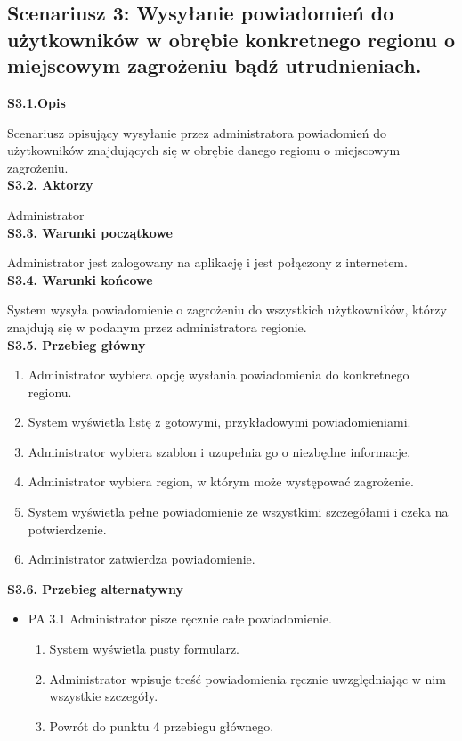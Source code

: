     \subsection*{Scenariusz 3: Wysyłanie powiadomień do użytkowników w obrębie konkretnego regionu o miejscowym zagrożeniu bądź utrudnieniach.} 
    \textbf{S3.1.Opis} \par
    Scenariusz opisujący wysyłanie przez administratora powiadomień do użytkowników znajdujących się w obrębie danego regionu o miejscowym zagrożeniu. \\
    \textbf{S3.2. Aktorzy} \par
    Administrator \\
    \textbf{S3.3. Warunki początkowe} \par
    Administrator jest zalogowany na aplikację i jest połączony z internetem. \\
    \textbf{S3.4. Warunki końcowe} \par
    System wysyła powiadomienie o zagrożeniu do wszystkich użytkowników, którzy znajdują się w podanym przez administratora regionie. \\
    \textbf{S3.5. Przebieg główny} \par
    \begin{enumerate}
        \item  Administrator wybiera opcję wysłania powiadomienia do konkretnego regionu.
        \item System wyświetla listę z gotowymi, przykładowymi powiadomieniami.
        \item Administrator wybiera szablon i uzupełnia go o niezbędne informacje.
        \item Administrator wybiera region, w którym może występować zagrożenie.
        \item System wyświetla pełne powiadomienie ze wszystkimi szczegółami i czeka na potwierdzenie.
        \item Administrator zatwierdza powiadomienie.
    \end{enumerate}
    \textbf{S3.6. Przebieg alternatywny} \par
    \begin{itemize}
        \item []PA 3.1 Administrator pisze ręcznie całe powiadomienie.
        \begin{enumerate}
            \item System wyświetla pusty formularz.
            \item Administrator wpisuje treść powiadomienia ręcznie uwzględniając w nim wszystkie szczegóły.
            \item Powrót do punktu 4 przebiegu głównego.
        \end{enumerate}
    \end{itemize}
